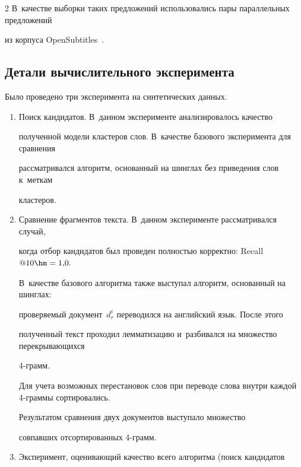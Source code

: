 \begin{multicols}{2}
В~качестве выборки таких предложений использовались пары параллельных предложений 


из корпуса OpenSubtitles~\cite{opus}. 





\vspace*{-6pt}





\subsection{Детали вычислительного эксперимента}





Было проведено три эксперимента на синтетических данных.


\begin{enumerate}


\item Поиск кандидатов. В~данном эксперименте анализировалось  качество 


полученной модели кластеров слов. В~качестве базового эксперимента для сравнения 


рассматривался алгоритм, основанный на шинглах без приведения слов к~меткам 


кластеров.


\item Сравнение фрагментов текста. В~данном эксперименте рассматривался случай, 


когда отбор кандидатов был проведен полностью корректно: Recall$@10\hm=1{,}0.$ 


В~качестве базового алгоритма также выступал алгоритм, основанный на шинглах: 


проверяемый документ~$d_r^i$ переводился на английский язык. После этого 


полученный текст проходил лемматизацию и~разбивался на множество перекрывающихся 


4-грамм.


Для учета возможных перестановок слов при переводе слова внутри каждой 4-грам\-мы сортировались. 


Результатом сравнения двух документов выступало множество 


совпавших отсортированных 4-грамм.





\item Эксперимент, оценивающий качество всего алгоритма (поиск кандидатов 



\end{enumerate}
\end{multicols}
